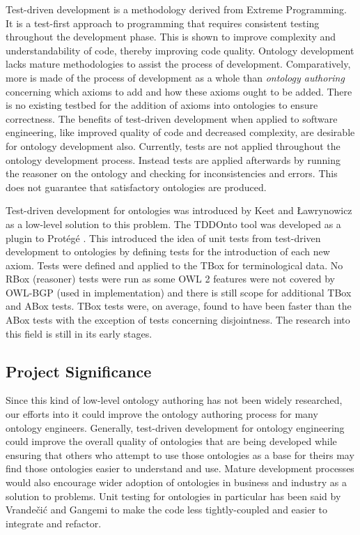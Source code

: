 \documentclass[draft]{sig-alternate}
\begin{document}
Test-driven development is a methodology derived from Extreme Programming. It is a test-first approach to programming that requires consistent testing throughout the development phase. This is shown to improve complexity and understandability of code, thereby improving code quality. Ontology development lacks mature methodologies to assist the process of development. Comparatively, more is made of the process of development as a whole than \textit{ontology authoring} concerning which axioms to add and how these axioms ought to be added. There is no existing testbed for the addition of axioms into ontologies to ensure correctness. The benefits of test-driven development when applied to software engineering, like improved quality of code and decreased complexity, are desirable for ontology development also. Currently, tests are not applied throughout the ontology development process. Instead tests are applied afterwards by running the reasoner on the ontology and checking for inconsistencies and errors. This does not guarantee that satisfactory ontologies are produced.

Test-driven development for ontologies was introduced by Keet and {\L}awrynowicz \cite{DBLP:journals/corr/KeetL15} as a low-level solution to this problem. The TDDOnto tool was developed as a plugin to Prot\'eg\'e \cite{DBLP:conf/dlog/LawrynowiczK16}. This introduced the idea of unit tests from test-driven development to ontologies by defining tests for the introduction of each new axiom. Tests were defined and applied to the TBox for terminological data. No RBox (reasoner) tests were run as some OWL 2 features were not covered by OWL-BGP (used in implementation) and there is still scope for additional TBox and ABox tests. TBox tests were, on average, found to have been faster than the ABox tests with the exception of tests concerning disjointness. The research into this field is still in its early stages.

\subsection{Project Significance}

Since this kind of low-level ontology authoring has not been widely researched, our efforts into it could improve the ontology authoring process for many ontology engineers. Generally, test-driven development for ontology engineering could improve the overall quality of ontologies that are being developed while ensuring that others who attempt to use those ontologies as a base for theirs may find those ontologies easier to understand and use. Mature development processes would also encourage wider adoption of ontologies in business and industry as a solution to problems. Unit testing for ontologies in particular has been said by Vrande{\v{c}}i{\'c} and Gangemi \cite{DBLP:conf/otm/VrandecicG06} to make the code less tightly-coupled and easier to integrate and refactor.
\end{document}
